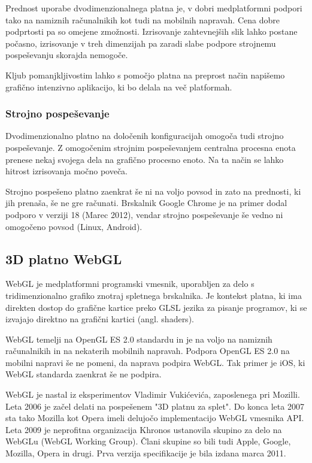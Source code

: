 Prednost uporabe dvodimenzionalnega platna je, v dobri medplatformni podpori tako na namiznih računalnikih kot tudi na mobilnih napravah. Cena dobre podprtosti pa so omejene zmožnosti. Izrisovanje zahtevnejših slik lahko postane počasno, izrisovanje v treh dimenzijah pa zaradi slabe podpore strojnemu pospeševanju skorajda nemogoče. 

Kljub pomanjkljivostim lahko s pomočjo platna na preprost način napišemo grafično intenzivno aplikacijo, ki bo delala na več platformah. 

\subsubsection{Strojno pospeševanje}

Dvodimenzionalno platno na določenih konfiguracijah omogoča tudi strojno pospeševanje. Z omogočenim strojnim pospeševanjem centralna procesna enota prenese nekaj svojega dela na grafično procesno enoto. Na ta način se lahko hitrost izrisovanja močno poveča.

Strojno pospešeno platno zaenkrat še ni na voljo povsod in zato na prednosti, ki jih prenaša, še ne gre računati. Brskalnik Google Chrome je na primer dodal podporo v verziji 18 (Marec 2012), vendar strojno pospeševanje še vedno ni omogočeno povsod (Linux, Android).

\subsection{3D platno WebGL}
\label{sec:WebGL}

WebGL \cite{webgl} je medplatformni programski vmesnik, uporabljen za delo s tridimenzionalno grafiko znotraj spletnega brskalnika. Je kontekst platna, ki ima direkten dostop do grafične kartice preko GLSL jezika za pisanje programov, ki se izvajajo direktno na grafični kartici (angl. shaders). 

WebGL temelji na OpenGL ES 2.0 standardu in je na voljo na namiznih računalnikih in na nekaterih mobilnih napravah. Podpora OpenGL ES 2.0 na mobilni napravi še ne pomeni, da naprava podpira WebGL. Tak primer je iOS, ki WebGL standarda zaenkrat še ne podpira.

WebGL je nastal iz eksperimentov Vladimir Vukićevića, zaposlenega pri Mozilli. Leta 2006 je začel delati na pospešenem "3D platnu za splet". Do konca leta 2007 sta tako Mozilla kot Opera imeli delujočo implementacijo WebGL vmesnika API. Leta 2009 je neprofitna organizacija Khronos ustanovila skupino za delo na WebGLu (WebGL Working Group). Člani skupine so bili tudi Apple, Google, Mozilla, Opera in drugi. Prva verzija specifikacije je bila izdana marca 2011.

